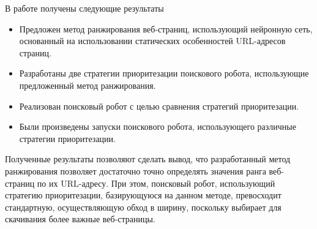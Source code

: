 \startconclusionpage

В работе получены следующие результаты

\begin{itemize}
\item Предложен метод ранжирования веб-страниц, использующий нейронную сеть, основанный на использовании статических особенностей URL-адресов страниц.
\item Разработаны две стратегии приоритезации поискового робота, использующие предложенный метод ранжирования.
\item Реализован поисковый робот с целью сравнения стратегий приоритезации.
\item Были произведены запуски поискового робота, использующего различные стратегии приоритезации.
\end{itemize}

Полученные результаты позволяют сделать вывод, что разработанный метод ранжирования позволяет достаточно точно определять значения ранга веб-страниц по их URL-адресу. При этом, поисковый робот, использующий стратегию приоритезации, базирующуюся на данном методе, превосходит стандартную, осуществляющую обход в ширину, поскольку выбирает для скачивания более важные веб-страницы.